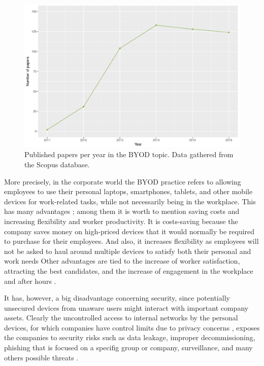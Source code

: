 \begin{figure}
	\centering
	\includegraphics[scale =0.5] {gfx/intro/BYODpapers_year.pdf}
	\caption{Published papers per year in the BYOD topic. Data gathered from the Scopus database.}
	\label{fig:pperyear}
\end{figure}

More precisely, in the corporate world the BYOD practice refers to allowing employees to use their personal laptops, smartphones, tablets, and other mobile devices for work-related tasks, while not necessarily being in the workplace. This has many advantages \cite{singh2012byod}; among them it is worth to mention saving costs and increasing flexibility and worker productivity. It is costs-saving because the company saves money on high-priced devices that it would normally be required to purchase for their employees. And also, it increases flexibility  as employees will not be asked to haul around multiple devices to satisfy both their personal and work needs Other advantages are tied to the increase of worker satisfaction, attracting the best candidates, and the increase of engagement in the workplace and after hours \cite{singh2012byod}.

It has, however, a big disadvantage concerning security, since potentially unsecured devices from unaware users might interact with important company assets. Clearly the uncontrolled access to internal networks by the personal devices, for which companies have control limits due to privacy concerns \cite{miller2012byod}, exposes the companies to security risks such as data leakage, improper decommissioning, phishing that is focused on a specifig group or company, surveillance, and many others possible threats \cite{lennon2012changing}.

